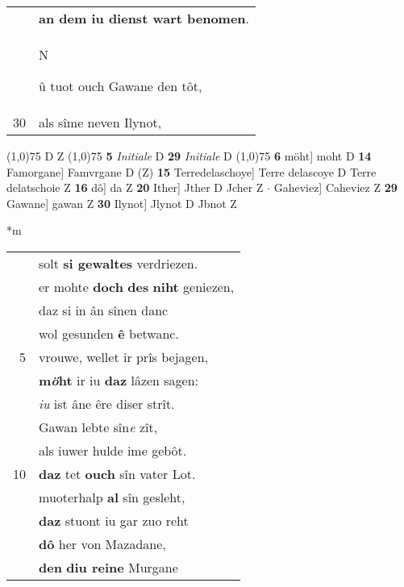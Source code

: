 \documentclass[8pt,a4paper,notitlepage]{article}
\begin{document}
\begin{table}[ht]
\begin{minipage}[t]{0.5\linewidth}
\begin{tabular}{rl}
 & \textbf{an dem iu dienst wart benomen}.\\ 
 & \begin{large}N\end{large}û tuot ouch Gawane den tôt,\\ 
30 & als sîme neven Ilynot,\\ 
\end{tabular}
\scriptsize
\line(1,0){75} \newline
D Z \newline
\line(1,0){75} \newline
\textbf{5} \textit{Initiale} D  \textbf{29} \textit{Initiale} D  \newline
\line(1,0){75} \newline
\textbf{6} möht] moht D \textbf{14} Famorgane] Famvrgane D (Z) \textbf{15} Terredelaschoye] Terre delascoye D Terre delatschoie Z \textbf{16} dô] da Z \textbf{20} Ither] Jther D Jcher Z  $\cdot$ Gaheviez] Caheviez Z \textbf{29} Gawane] gawan Z \textbf{30} Ilynot] Jlynot D Jbnot Z \newline
\end{minipage}
\hspace{0.5cm}
\begin{minipage}[t]{0.5\linewidth}
\small
\begin{center}*m
\end{center}
\begin{tabular}{rl}
 & solt \textbf{si gewaltes} verdriezen.\\ 
 & er mohte \textbf{doch} \textbf{des} \textbf{niht} geniezen,\\ 
 & daz si in ân sînen danc\\ 
 & wol gesunden \textbf{ê} betwanc.\\ 
5 & vrouwe, wellet ir prîs bejagen,\\ 
 & \textbf{m\textit{ö}ht} ir iu \textbf{daz} lâzen sagen:\\ 
 & \textit{iu} ist âne êre diser strît.\\ 
 & Gawan lebte sîn\textit{e} zît,\\ 
 & als iuwer hulde ime gebôt.\\ 
10 & \textbf{daz} tet \textbf{ouch} sîn vater Lot.\\ 
 & muoterhalp \textbf{al} sîn gesleht,\\ 
 & \textbf{daz} stuont iu gar zuo reht\\ 
 & \textbf{dô} her von Mazadane,\\ 
 & \textbf{den} \textbf{diu reine} Murgane\\ 

\end{tabular}
\end{minipage}
\end{table}
\end{document}
